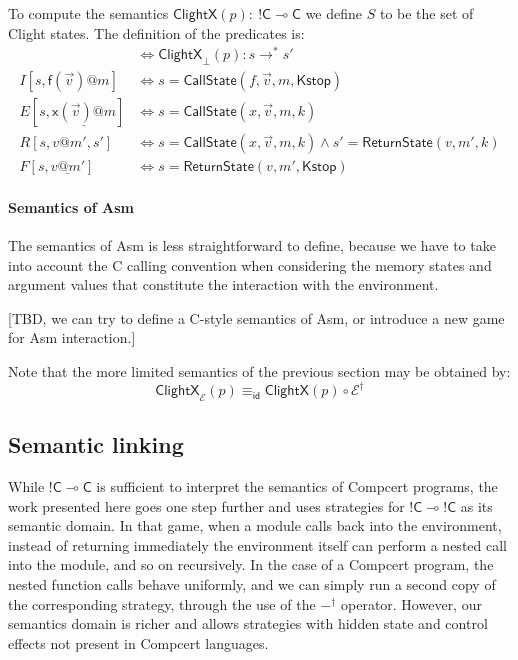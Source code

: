 \documentclass[acmsmall,anonymous]{acmart}
\makeatletter
\newcommand{\kw}[1]{\ensuremath{ \textsf{#1} }}
\newcommand{\EC}{\kw{C}}
\newcommand{\mcall}[3]{\kw{#1}({#2})@{#3}}
\newcommand{\pcall}[3]{%
  \underline{\mcall{#1}{#2}{#3}}%
}
\newcommand{\mret}[2]{{#1}@{#2}}
\newcommand{\pret}[2]{%
  \underline{\mret{#1}{#2}}%
}
\makeatother
\begin{document}
To compute the semantics $\kw{ClightX}(p) : \: !\EC \multimap \EC$
we define $S$ to be the set of Clight states.
The definition of the predicates is:
\begin{align*}
  [s \Rightarrow s'] &\Leftrightarrow
    \kw{ClightX}_\bot(p) : s \rightarrow^* s' \\
  I[s, \mcall{f}{\vec{v}}{m}] &\Leftrightarrow
    s = \kw{CallState}(f, \vec{v}, m, \kw{Kstop}) \\
  E[s, \pcall{x}{\vec{v}}{m}] &\Leftrightarrow
    s = \kw{CallState}(x, \vec{v}, m, k) \\
  R[s, \mret{v}{m'}, s'] &\Leftrightarrow
    s = \kw{CallState}(x, \vec{v}, m, k) \wedge
    s' = \kw{ReturnState}(v, m', k) \\
  F[s, \pret{v}{m'}] &\Leftrightarrow
    s = \kw{ReturnState}(v, m', \kw{Kstop})
\end{align*}


\paragraph{Semantics of Asm} %

The semantics of Asm is less straightforward to define,
because we have to take into account the C calling convention
when considering the memory states and argument values
that constitute the interaction with the environment.

[TBD, we can try to define a C-style semantics of Asm,
or introduce a new game for Asm interaction.]


Note that the more limited semantics of the previous section
may be obtained by:
\[ \kw{ClightX}_\mathcal{E}(p) \equiv_\kw{id} \kw{ClightX}(p) \circ \mathcal{E}^\dagger \]


\subsection{Semantic linking} %

While ${!\EC} \multimap \EC$ is sufficient
to interpret the semantics of Compcert programs,
the work presented here goes one step further
and uses strategies for ${!\EC} \multimap {!\EC}$
as its semantic domain.
In that game,
when a module calls back into the environment,
instead of returning immediately
the environment itself
can perform a nested call into the module,
and so on recursively.
In the case of a Compcert program,
the nested function calls behave uniformly,
and we can simply run a second copy of
the corresponding strategy,
through the use of the $-^\dagger$ operator.
However,
our semantics domain is richer
and allows strategies with hidden state
and control effects
not present in Compcert languages.
\end{document}
